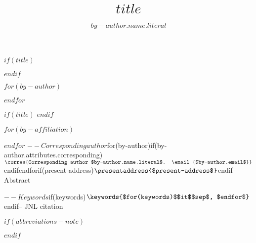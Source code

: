$if(title)$
\title{$title$}
$endif$

$for(by-author)$
\author[$for(by-author.affiliations)$$it.number$$sep$,$endfor$]{$by-author.name.literal$}
$endfor$

$if(title)$
$endif$

$for(by-affiliation)$
\address[$it.number$]{%
}

$endfor$
$-- Corresponding author
$for(by-author)$
$if(by-author.attributes.corresponding)$\corres{Corresponding author $by-author.name.literal$. \email{$by-author.email$}}$endif$
$endfor$
$if(present-address)$
\presentaddress{$present-address$}
$endif$


$-- Abstract

$-- Keywords
$if(keywords)$
\keywords{$for(keywords)$$it$$sep$, $endfor$}
$endif$

$-- JNL citation

\maketitle

$if(abbreviations-note)$
\renewcommand\thefootnote{}

\renewcommand\thefootnote{\fnsymbol{footnote}}
\setcounter{footnote}{1}
$endif$